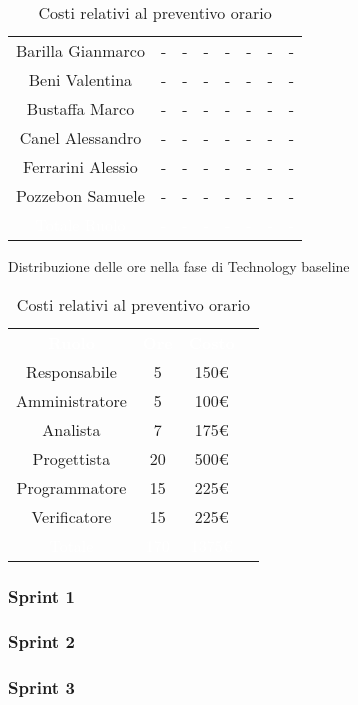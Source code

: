 \begin{table}[h!]
\begin{minipage}[c]{0.53\textwidth}
\begin{tabular}{>{\raggedright\arraybackslash}c|cccccc|c}
		\rowcolor[RGB]{216, 235, 171}
	    	Barilla Gianmarco & - & - & - & - & - & -& -		\\[4pt]
	    \rowcolor[RGB]{233, 245, 206}
	    	Beni Valentina & - & - & - & - & - & -& -			\\[4pt]
	    \rowcolor[RGB]{216, 235, 171}
	    	Bustaffa Marco & - & - & - & - & - & -& -			\\[4pt]
        \rowcolor[RGB]{233, 245, 206}
	    	Canel Alessandro & - & - & - & - & - & -& -			\\[4pt]
        \rowcolor[RGB]{216, 235, 171}
	    	Ferrarini Alessio & - & - & - & - & - & -& -		\\[4pt]
        \rowcolor[RGB]{233, 245, 206}
	    	Pozzebon Samuele & - & - & - & - & - & -& -			\\[4pt]
		\rowcolor[RGB]{47, 106, 73}
			\textcolor{white}{Totale Ruolo} & \textcolor{white}{-} & \textcolor{white}{-} & \textcolor{white}{-} 
			& \textcolor{white}{-} & \textcolor{white}{-} & \textcolor{white}{-}
			& \textcolor{white}{-} \\[4pt]	
    \end{tabular}
    \caption{Distribuzione delle ore nella fase di Technology baseline}
\end{minipage}
\hfill
\begin{minipage}{0.33\textwidth}
	\centering
	\begin{tabular}{cccc}
	    \rowcolor[RGB]{33, 73, 50}
	    \textcolor{white}{\textbf{Ruolo}} & \textcolor{white}{\textbf{Ore}} & \textcolor{white}{\textbf{Costo}}\\[4pt]
	    \rowcolor[RGB]{216, 235, 171}
	    Responsabile & 5 & 150\euro\\[4pt]
	    \rowcolor[RGB]{233, 245, 206}
	    Amministratore & 5 & 100\euro\\[4pt]
        \rowcolor[RGB]{216, 235, 171}
	    Analista & 7 & 175\euro\\[4pt]
	    \rowcolor[RGB]{233, 245, 206}
	    Progettista & 20 & 500\euro\\[4pt]
        \rowcolor[RGB]{216, 235, 171}
	    Programmatore & 15 & 225\euro\\[4pt]
	    \rowcolor[RGB]{233, 245, 206}
	    Verificatore & 15 & 225\euro\\[4pt]
		\rowcolor[RGB]{47, 106, 73}
			\textcolor{white}{Totale} & \textcolor{white}{170} & \textcolor{white}{1375\euro}\\[4pt]	
    \end{tabular}	
	\caption{Costi relativi al preventivo orario}

\end{minipage}
\end{table}

\subsubsection{Sprint 1}
\subsubsection{Sprint 2}
\subsubsection{Sprint 3}

\setlength\extrarowheight{0pt}